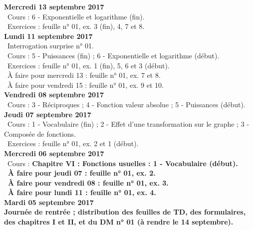 \documentclass[12pt,a4paper]{article}
\begin{document}
\noindent\textbf{\bf Mercredi 13 septembre 2017}\\
\bu\ Cours : 6 - Exponentielle et logarithme (fin).\\
\bu\ Exercices : feuille n° 01, ex. 3 (fin), 4, 7 et 8.\vspace{.4cm}\\

\noindent\textbf{\bf Lundi 11 septembre 2017}\\
\bu\ Interrogation surprise n° 01.\\
\bu\ Cours : 5 - Puissances (fin) ; 6 - Exponentielle et logarithme (début).\\
\bu\ Exercices : feuille n° 01, ex. 1 (fin), 5, 6 et 3 (début).\\
\bu\ À faire pour mercredi 13 : feuille n° 01, ex. 7 et 8.\\
\bu\ À faire pour vendredi 15 : feuille n° 01, ex. 9 et 10.\vspace{.4cm}\\

\noindent\textbf{Vendredi 08 septembre 2017}\\
\bu\ Cours : 3 - Réciproques ; 4 - Fonction valeur absolue ; 5 - Puissances (début).\vspace{.4cm}\\

\noindent\textbf{\bf Jeudi 07 septembre 2017}\\
\bu\ Cours : 1 - Vocabulaire (fin) ; 2 - Effet d'une transformation sur le graphe ; 3 - Composée de fonctions.\\
\bu\ Exercices : feuille n° 01, ex. 2 et 1 (début).\vspace{.4cm}\\
   
\noindent\textbf{\bf Mercredi 06 septembre 2017}\\
\bu\ Cours : \bf Chapitre VI \rm : Fonctions usuelles : 1 - Vocabulaire (début).\\
\bu\ À faire pour jeudi 07 : feuille n° 01, ex. 2.\\
\bu\ À faire pour vendredi 08 : feuille n° 01, ex. 3.\\
\bu\ À faire pour lundi 11 : feuille n° 01, ex. 4.\vspace{.4cm}\\

\noindent\textbf{\bf Mardi 05 septembre 2017}\\
Journée de rentrée ; distribution des feuilles de TD, des formulaires, des
chapitres I et II, et du DM n° 01 (à rendre le 14 septembre).\vspace{.4cm}\\


\label{end}
\end{document}
